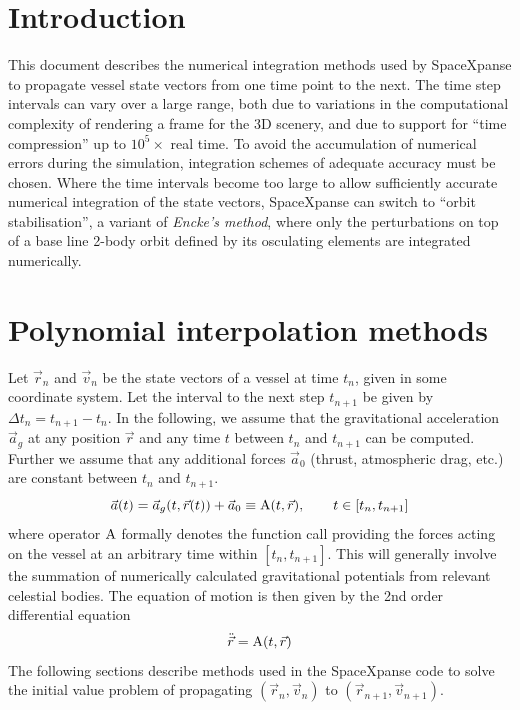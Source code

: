 \documentclass[a4paper]{article}
\begin{document}


\newcommand{\ACC}{\ensuremath\mathrm{A}}
\newcommand{\AACC}{\ensuremath\mathrm{T}}
\newcommand{\Euler}{\ensuremath\mathrm{E}}


\newcommand{\vR}[1]{\ensuremath{\vec{R}_{#1}}}
\newcommand{\nR}[1]{\ensuremath{|\vR{#1}|}}

\maketitle

\section{Introduction}
This document describes the numerical integration methods used by SpaceXpanse to propagate vessel state vectors from one time point to the next. The time step intervals can vary over a large range, both due to variations in the computational complexity of rendering a frame for the 3D scenery, and due to support for ``time compression'' up to $10^5 \times$ real time.
To avoid the accumulation of numerical errors during the simulation, integration schemes of adequate accuracy must be chosen.
Where the time intervals become too large to allow sufficiently accurate numerical integration of the state vectors, SpaceXpanse can switch to ``orbit stabilisation'', a variant of \emph{Encke's method}, where only the perturbations on top of a base line 2-body orbit defined by its osculating elements are integrated numerically.

\section{Polynomial interpolation methods}
Let $\vec{r}_n$ and $\vec{v}_n$ be the state vectors of a vessel at time $t_n$, given in some coordinate system. Let the interval to the next step $t_{n+1}$ be given by $\Delta t_n = t_{n+1}-t_n$.
 In the following, we assume that the gravitational acceleration $\vec{a}_g$ at any position $\vec{r}$ and any time $t$ between $t_n$ and $t_{n+1}$ can be computed. Further we assume that any additional forces $\vec{a}_0$ (thrust, atmospheric drag, etc.) are constant between $t_n$ and $t_{n+1}$.
\begin{equation*}
\vec{a}(t) = \vec{a}_g(t,\vec{r}(t)) + \vec{a}_0 \equiv \ACC(t,\vec{r}),\qquad t \in [t_n, t_{n+1}]
\end{equation*}
where operator $\ACC$ formally denotes the function call providing the forces acting on the vessel at an arbitrary time within $[t_n, t_{n+1}]$.
This will generally involve the summation of numerically calculated gravitational potentials from relevant celestial bodies.
The equation of motion is then given by the 2nd order differential equation
\begin{equation}\label{eq:motion}
\ddot{\vec{r}} = \ACC(t,\vec{r})
\end{equation}
The following sections describe methods used in the SpaceXpanse code to solve the initial value problem of propagating $(\vec{r}_n,\vec{v}_n)$ to $(\vec{r}_{n+1},\vec{v}_{n+1})$.
\end{document}
